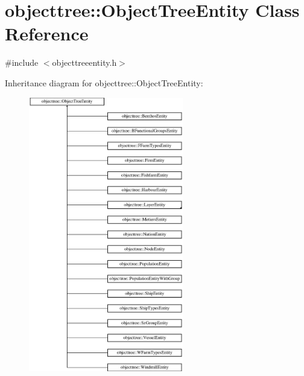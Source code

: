\hypertarget{classobjecttree_1_1_object_tree_entity}{}\section{objecttree\+::Object\+Tree\+Entity Class Reference}
\label{classobjecttree_1_1_object_tree_entity}


{\ttfamily \#include $<$objecttreeentity.\+h$>$}

Inheritance diagram for objecttree\+::Object\+Tree\+Entity\+:\begin{figure}[H]
\begin{center}
\leavevmode
\includegraphics[height=12.000000cm]{d8/da8/classobjecttree_1_1_object_tree_entity}
\end{center}
\end{figure}
